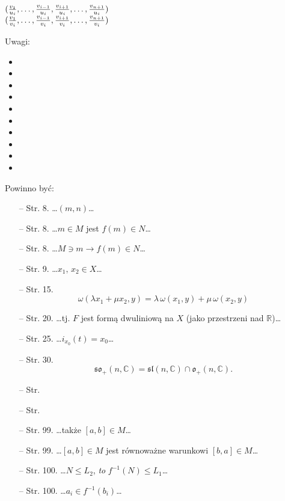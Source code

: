 \documentclass[a4paper,11pt]{article}
\begin{document}
\noi
{} \\
\Jest
$( \frac{ v_{ 1 } }{ u_{ i } }, \ldots, \frac{ v_{ i - 1 } }{ u_{ i } },
\frac{ v_{ i + 1 } }{ u_{ i } }, \ldots, \frac{ v_{ n + 1 } }{ u_{ i } } )$ \\
\Pow $( \frac{ v_{ 1 } }{ v_{ i } }, \ldots, \frac{ v_{ i - 1 } }{ v_{ i } },
\frac{ v_{ i + 1 } }{ v_{ i } }, \ldots, \frac{ v_{ n + 1 } }{ v_{ i } } )$ \\







Uwagi:\\
\begin{itemize}
\item
\item
\item
\item
\item
\item
\item
\item
\item
\item
\end{itemize}

Powinno być:
\begin{itemize}
\item[--] Str. 8. \ldots$( m, n )$\ldots
\item[--] Str. 8. \ldots$m \in M$ jest $f( m ) \in N$\ldots
\item[--] Str. 8. \ldots$M \ni m \rightarrow f( m ) \in N$\ldots
\item[--] Str. 9. \ldots$x_{ 1 }, \, x_{ 2 } \in X$\ldots
\item[--] Str. 15.
  $$\omega( \lambda x_{ 1 } + \mu x_{ 2 }, y ) = \lambda \, \omega(
  x_{ 1 }, y ) + \mu \, \omega( x_{ 2 }, y )$$
\item[--] Str. 20. \ldots tj. $F$ jest formą dwuliniową na $X$ (jako
  przestrzeni nad $\mathbb{R}$)\ldots
\item[--] Str. 25. \ldots$i_{ x_{ 0 } }( t ) = x_{ 0 }$\ldots
\item[--] Str. 30.
  $$\mathfrak{so}_{ + }( n, \mathbb{C} ) = \mathfrak{sl}( n,
  \mathbb{C} ) \cap \mathfrak{o}_{ + }( n, \mathbb{C} ) \textrm{.}$$
\item[--] Str.
\item[--] Str.
\item[--] Str. 99. \ldots także $[ a, b ] \in M$\ldots
\item[--] Str. 99. \ldots $[ a, b ] \in M$ jest równoważne warunkowi
  $[ b, a ] \in M$\ldots
\item[--] Str. 100. \ldots$N \leq L_{ 2 }$, \emph{to}
  $f^{ -1 }( N ) \leq L_{ 1 }$\ldots
\item[--] Str. 100. \ldots$a_{ i } \in f^{ -1 }( b_{ i } )$\ldots
\end{itemize}
\end{document}

